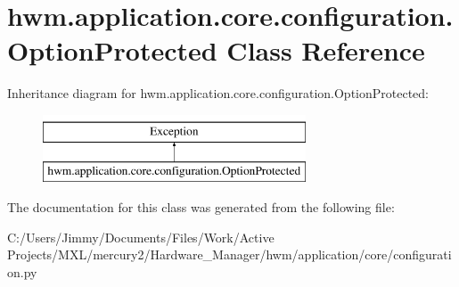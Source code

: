 \hypertarget{classhwm_1_1application_1_1core_1_1configuration_1_1_option_protected}{\section{hwm.\-application.\-core.\-configuration.\-Option\-Protected Class Reference}
\label{classhwm_1_1application_1_1core_1_1configuration_1_1_option_protected}
}
Inheritance diagram for hwm.\-application.\-core.\-configuration.\-Option\-Protected\-:\begin{figure}[H]
\begin{center}
\leavevmode
\includegraphics[height=2.000000cm]{classhwm_1_1application_1_1core_1_1configuration_1_1_option_protected}
\end{center}
\end{figure}


The documentation for this class was generated from the following file\-:\begin{DoxyCompactItemize}
\item 
C\-:/\-Users/\-Jimmy/\-Documents/\-Files/\-Work/\-Active Projects/\-M\-X\-L/mercury2/\-Hardware\-\_\-\-Manager/hwm/application/core/configuration.\-py\end{DoxyCompactItemize}
